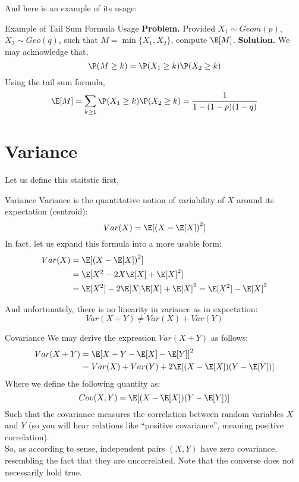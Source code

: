 And here is an example of its usage:
\begin{ln-explain}{Example of Tail Sum Formula Usage}{}
    \textbf{Problem.} Provided $X_1 \sim Geom(p)$, $X_2 \sim Geo(q)$, such that $M = \min\{X_1, X_2\}$, compute $\E[M]$.
    \tcblower
    \textbf{Solution. } We may acknowledge that,
    \[
        \P(M \geq k) = \P(X_1 \geq k) \P(X_2 \geq k)
    \]
    Using the tail sum formula,
    \[
        \E[M] = \sum_{k \geq 1} \P(X_1 \geq k) \P(X_2 \geq k) = \frac{1}{1 - (1 - p)(1 - q)}
    \]
\end{ln-explain}

\section{Variance}
Let us define this staitstic first,
\begin{ln-define}{Variance}{}
    Variance is the quantitative notion of variability of $X$ around its expectation (centroid):
    \[
        Var(X) = \E[{(X - \E[X])}^2]
    \]
    In fact, let us expand this formula into a more usable form:
    \begin{align*}
        Var(X)
        &= \E[{(X - \E[X])}^2] \\
        &= \E[X^2 - 2X\E[X] + {\E[X]}^2] \\
        &= \E[X^2] - 2\E[X]\E[X] + {\E[X]}^2 = \E[X^2] - {\E[X]}^2
    \end{align*}
\end{ln-define}
And unfortunately, there is no linearity in variance as in expectation:
\[
    Var(X + Y) \neq Var(X) + Var(Y)
\]
\begin{ln-define}{Covariance}{}
    We may derive the expression $Var(X + Y)$ as follows:
    \begin{align*}
        Var(X + Y)
        &= {\E[X + Y - \E[X] - \E[Y]]}^2 \\
        &= Var(X) + Var(Y) + 2 \E[(X - \E[X])(Y - \E[Y])]
    \end{align*}
    Where we define the following quantity as:
    \[
        Cov(X, Y) = \E[(X - \E[X])(Y - \E[Y])]
    \]
    Such that the covariance measures the correlation between random variables $X$ and $Y$ (so you will hear relations like ``positive covariance'', meaning positive correlation). \\
    So, as according to sense, independent pairs $(X, Y)$ have zero covariance, resembling the fact that they are uncorrelated. Note that the converse does not necessarily hold true.
\end{ln-define}
